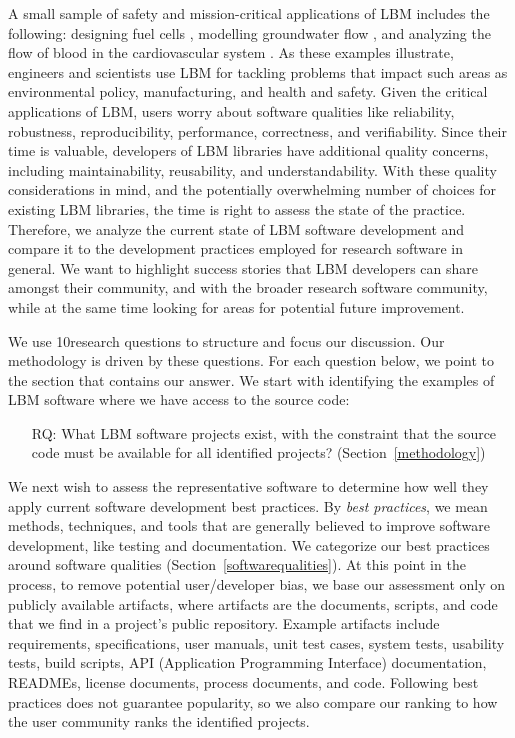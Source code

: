 \documentclass[final, 3p, times, authoryear]{elsarticle}
\newcounter{rqnum} %
\begin{document}
A small sample of safety and mission-critical applications of LBM includes the
following: designing fuel cells \citep{ZhangEtAl2018}, modelling groundwater
flow \citep{AnwarAndSukop2009}, and analyzing the flow of blood in the
cardiovascular system \citep{SadeghiEtAl2022b, SadeghiEtAl2022,
SadeghiEtAl2020}.  As these examples illustrate, engineers and scientists use
LBM for tackling problems that impact such areas as environmental policy,
manufacturing, and health and safety. Given the critical applications of LBM,
users worry about software qualities like reliability, robustness,
reproducibility, performance, correctness, and verifiability.  Since their time
is valuable, developers of LBM libraries have additional quality concerns,
including maintainability, reusability, and understandability.  With these
quality considerations in mind, and the potentially overwhelming number of
choices for existing LBM libraries, the time is right to assess the state of the
practice. Therefore, we analyze the current state of LBM software development
and compare it to the development practices employed for research software in
general.  We want to highlight success stories that LBM developers can share
amongst their community, and with the broader research software community, while
at the same time looking for areas for potential future improvement.

We use 10research questions to structure and focus our discussion. Our
methodology \citep{SmithEtAl2021, SmithAndMichalski2022} is driven by these
questions. For each question below, we point to the section that contains our
answer.  We start with identifying the examples of LBM software where we have
access to the source code:

\begin{enumerate}
	\item[RQ\refstepcounter{rqnum}\therqnum \label{RQ_WhatProjects}:] What LBM
	software projects exist, with the constraint that the source code must be
	available for all identified projects? (Section~\ref{methodology})
\end{enumerate}

We next wish to assess the representative software to determine how well they
apply current software development best practices.  By \emph{best practices}, we
mean methods, techniques, and tools that are generally believed to improve
software development, like testing and documentation.  We categorize our best
practices around software qualities (Section~\ref{softwarequalities}).  At this
point in the process, to remove potential user/developer bias, we base our
assessment only on publicly available artifacts, where artifacts are the
documents, scripts, and code that we find in a project's public repository.
Example artifacts include requirements, specifications, user manuals, unit test
cases, system tests, usability tests, build scripts, API (Application
Programming Interface) documentation, READMEs, license documents, process
documents, and code. Following best practices does not guarantee popularity, so
we also compare our ranking to how the user community ranks the identified
projects.
\end{document}
